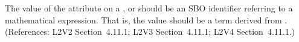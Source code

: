 The value of the  attribute on a \AlgebraicRule, \RateRule or
\AssignmentRule should be an SBO identifier referring to a mathematical
expression.  That is, the value should be a term derived from
\sbomathformula.  (References: L2V2 Section~4.11.1;
L2V3 Section~4.11.1; L2V4 Section~4.11.1.)
